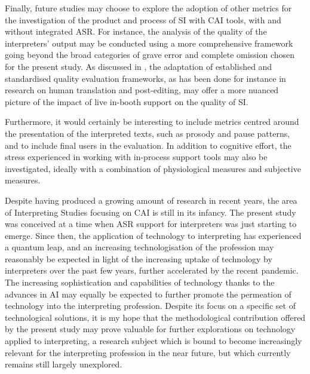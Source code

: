 Finally, future studies may choose to explore the adoption of other metrics for the investigation of the product and process of SI with CAI tools, with and without integrated ASR. For instance, the analysis of the quality of the interpreters' output may be conducted using a more comprehensive framework going beyond the broad categories of grave error and complete omission chosen for the present study. As discussed in , the adaptation of established and standardised quality evaluation frameworks, as has been done for instance in research on human translation and post-editing, may offer a more nuanced picture of the impact of live in-booth support on the quality of SI.

\begin{sloppypar}
Furthermore, it would certainly be interesting to include metrics centred around the presentation of the interpreted texts, such as prosody and pause patterns, and to include final users in the evaluation. In addition to cognitive effort, the stress experienced in working with in-process support tools may also be investigated, ideally with a combination of physiological measures and subjective measures.
\end{sloppypar}

Despite having produced a growing amount of research in recent years, the area of Interpreting Studies focusing on CAI is still in its infancy. The present study was conceived at a time when ASR support for interpreters was just starting to emerge. Since then, the application of technology to interpreting has experienced a quantum leap, and an increasing technologisation of the profession may reasonably be expected in light of the increasing uptake of technology by interpreters over the past few years, further accelerated by the recent pandemic. The increasing sophistication and capabilities of technology thanks to the advances in AI may equally be expected to further promote the permeation of technology into the interpreting profession. Despite its focus on a specific set of technological solutions, it is my hope that the methodological contribution offered by the present study may prove valuable for further explorations on technology applied to interpreting, a research subject which is bound to become increasingly relevant for the interpreting profession in the near future, but which currently remains still largely unexplored. 
